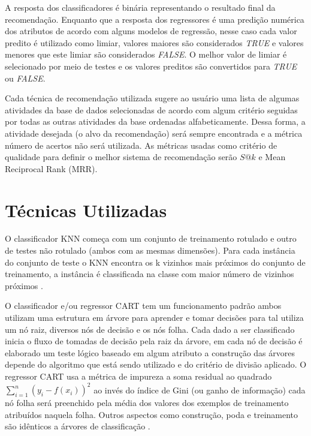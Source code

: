 \documentclass{acm_proc_article-sp}
\begin{document}
A resposta dos classificadores {\'e} bin{\'a}ria representando o resultado final da recomenda\c{c}{\~a}o. Enquanto que a resposta dos regressores {\'e} uma predi\c{c}{\~a}o num{\'e}rica dos atributos de acordo com alguns modelos de regress{\~a}o, nesse caso cada valor predito {\'e} utilizado como limiar, valores maiores s{\~a}o considerados \emph{TRUE} e valores menores que este limiar s{\~a}o considerados \emph{FALSE}. O melhor valor de limiar {\'e} selecionado por meio de testes e os valores preditos s{\~a}o convertidos para \emph{TRUE} ou \emph{FALSE}. 

Cada t{\'e}cnica de recomenda\c{c}{\~a}o utilizada sugere ao usu{\'a}rio uma lista de algumas atividades da base de dados selecionadas de acordo com algum crit{\'e}rio seguidas por todas as outras atividades da base ordenadas alfabeticamente. Dessa forma, a atividade desejada (o alvo da recomenda\c{c}{\~a}o) ser{\'a} sempre encontrada e a m{\'e}trica n{\'u}mero de acertos n{\~a}o ser{\'a} utilizada. As m{\'e}tricas usadas como crit{\'e}rio de qualidade para definir o melhor sistema de recomenda\c{c}{\~a}o ser{\~a}o \(S@k\) e Mean Reciprocal Rank (MRR).

\section{T{\'e}cnicas Utilizadas}\label{TECNICAS}
O classificador KNN come\c{c}a com um conjunto de treinamento rotulado e outro de testes n{\~a}o rotulado (ambos com as mesmas dimens{\~o}es). Para cada inst{\^a}ncia do conjunto de teste o KNN encontra os k vizinhos mais pr{\'o}ximos do conjunto de treinamento, a inst{\^a}ncia {\'e} classificada na classe com maior n{\'u}mero de vizinhos pr{\'o}ximos \cite{MachineLearningwithR2013}.

O classificador e/ou regressor CART tem um funcionamento padr{\~a}o ambos utilizam uma estrutura em {\'a}rvore para aprender e tomar decis{\~o}es para tal utiliza um n{\'o} raiz, diversos n{\'o}s de decis{\~a}o e os n{\'o}s folha. Cada dado a ser classificado inicia o fluxo de tomadas de decis{\~a}o pela raiz da {\'a}rvore, em cada n{\'o} de decis{\~a}o {\'e} elaborado um teste l{\'o}gico baseado em algum atributo a constru\c{c}{\~a}o das {\'a}rvores depende do algoritmo que est{\'a} sendo utilizado e do crit{\'e}rio de divis{\~a}o aplicado. O regressor CART usa a m{\'e}trica de impureza a soma residual ao quadrado \(\sum\limits_{i = 1}^{n}(y_{i} - f(x_{i}))^{2}\) ao inv{\'e}s do {\'i}ndice de Gini (ou ganho de informa\c{c}{\~a}o) cada n{\'o} folha ser{\'a} preenchido pela m{\'e}dia dos valores dos exemplos de treinamento atribu{\'i}dos naquela folha. Outros aspectos como constru\c{c}{\~a}o, poda e treinamento s{\~a}o id{\^e}nticos a {\'a}rvores de classifica\c{c}{\~a}o \cite{Connor2007}.
\end{document}
